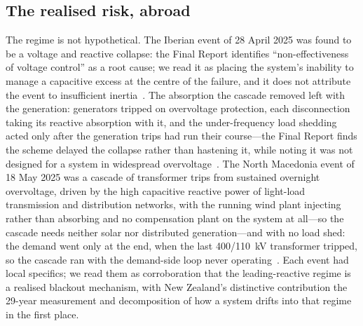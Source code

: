 \documentclass[journal]{IEEEtran}
\begin{document}
\subsection{The realised risk, abroad}
The regime is not hypothetical. The Iberian event of 28 April 2025 was found to be
a voltage and reactive collapse: the Final Report identifies ``non-effectiveness
of voltage control'' as a root cause; we read it as placing the system's
inability to manage a capacitive excess at the centre of the failure, and it
does not attribute the event to insufficient
inertia~\cite{entsoe_iberia}. The absorption the cascade removed left with the
generation: generators tripped on overvoltage protection, each disconnection
taking its reactive absorption with it, and the under-frequency load shedding
acted only after the generation trips had run their course---the Final Report
finds the scheme delayed the collapse rather than hastening it, while noting it
was not designed for a system in widespread
overvoltage~\cite{entsoe_iberia}. The North Macedonia event
of 18 May 2025 was a cascade of transformer trips from sustained overnight
overvoltage, driven by the high capacitive reactive power of light-load
transmission and distribution networks, with the running wind plant injecting
rather than absorbing and no compensation plant on the system at all---so the
cascade needs neither solar nor distributed generation---and with no load shed:
the demand went only at the end, when the last 400/110~kV transformer tripped,
so the cascade ran with the demand-side loop never
operating~\cite{entsoe_nm}. Each event had local specifics; we read them as
corroboration that the leading-reactive regime is a realised blackout
mechanism, with New Zealand's distinctive contribution the 29-year measurement
and decomposition of how a system drifts into that regime in the first place.
\end{document}
